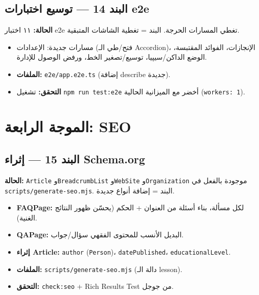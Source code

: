 \documentclass[11pt]{article}
\begin{document}
\subsection{البند 14 — توسيع اختبارات e2e}

\begin{notebox}
\textbf{الحالة:} ١١ اختبار e2e تغطي المسارات الحرجة. البند = تغطية الشاشات المتبقية.
\end{notebox}

\begin{itemize}
  \item مسارات جديدة: الإعدادات (فتح/طي الـ Accordion)، الإنجازات، الفوائد المقتبسة، الوضع الداكن/سيپيا،
        توسيع/تصغير الخط، ورفض الوصول للإدارة.
  \item \textbf{الملفات:} \texttt{e2e/app.e2e.ts} (إضافة describe جديدة).
  \item \textbf{التحقق:} تشغيل \texttt{npm run test:e2e} أخضر مع الميزانية الحالية (\texttt{workers: 1}).
\end{itemize}

\section{الموجة الرابعة: SEO}

\subsection{البند 15 — إثراء Schema.org}

\begin{notebox}
\textbf{الحالة:} \texttt{Article} و\texttt{BreadcrumbList} و\texttt{WebSite} و\texttt{Organization}
موجودة بالفعل في \texttt{scripts/generate-seo.mjs}. البند = إضافة أنواع جديدة.
\end{notebox}

\begin{itemize}
  \item \textbf{FAQPage:} لكل مسألة، بناء أسئلة من العنوان + الحكم (يحسّن ظهور النتائج الغنية).
  \item \textbf{QAPage:} البديل الأنسب للمحتوى الفقهي سؤال/جواب.
  \item \textbf{إثراء Article:} \texttt{author} (\texttt{Person})، \texttt{datePublished}، \texttt{educationalLevel}.
  \item \textbf{الملفات:} \texttt{scripts/generate-seo.mjs} (دالة الـ lesson).
  \item \textbf{التحقق:} \texttt{check:seo} + Rich Results Test من جوجل.
\end{itemize}
\end{document}
